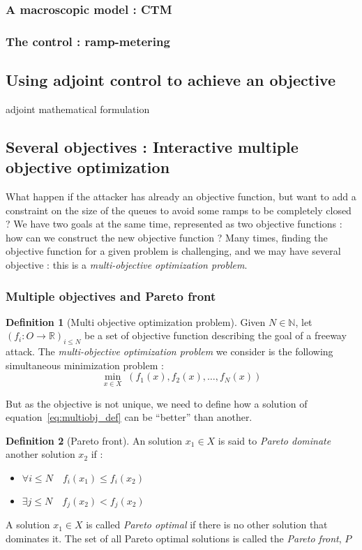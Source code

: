 \documentclass{article}
\theoremstyle{definition}
\newtheorem{definition}{Definition}[section]
\theoremstyle{remark}
\begin{document}
		\subsubsection{A macroscopic model : CTM}
		\subsubsection{The control : ramp-metering}	
	\subsection{Using adjoint control to achieve an objective}
		adjoint mathematical formulation
	\subsection{Several objectives : Interactive multiple objective optimization}
		What happen if the attacker has already an objective function, but want to add a constraint on the size of the queues to avoid some ramps to be completely closed ? We have two goals at the same time, represented as two objective functions : how can we construct the new objective function ? Many times, finding the objective function for a given problem is challenging, and we may have several objective : this is a \emph{multi-objective optimization problem}.
		\subsubsection{Multiple objectives and Pareto front}
			\begin{definition}[Multi objective optimization problem]
			Given $N \in \mathbb{N}$, let $ ( f_i : O  \longrightarrow \mathbb{R})_{i \leq N} $ be a set of objective function describing the goal of a freeway attack. The \emph{multi-objective optimization problem} we consider is the following simultaneous minimization problem :
				\begin{equation}\label{eq:multiobj_def}
						\min_{x\in X} \; \left(f_1(x), f_2(x),\ldots, f_N(x) \right)
				\end{equation}
			\end{definition}
			But as the objective is not unique, we need to define how a solution of equation~\ref{eq:multiobj_def} can be ``better'' than another.

			\begin{definition}[Pareto front]
			An solution $x_1 \in X$ is said to \emph{Pareto dominate} another solution $x_2$ if :
				\begin{itemize}
						\item $\forall i \leq N \quad f_i(x_1) \leq f_i(x_2)$
						\item $\exists j \leq N \quad f_j(x_2) < f_j(x_2)$
				\end{itemize}
			A solution $x_1 \in X$ is called \emph{Pareto optimal} if there is no other solution that dominates it. The set of all Pareto optimal solutions is called the \emph{Pareto front}, $P$
			\end{definition}
\end{document}
